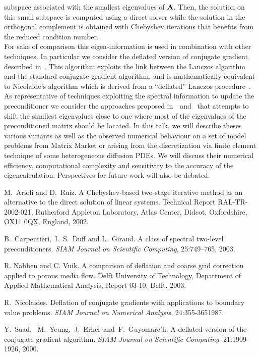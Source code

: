 \documentclass{report}
\begin{document}
subspace associated with the smallest eigenvalues of ${\bf A}$.
Then, the solution on this small subspace is computed using a direct
solver while the solution in the orthogonal complement is obtained with
Chebyshev iterations that benefits from the reduced condition number.\\
For sake of comparison this eigen-information is used in combination with
other techniques.
In particular we consider the deflated version of conjugate gradient
described in~\cite{syeg:00}.
This algorithm exploits the link between the Lanczos algorithm and the
standard conjugate gradient algorithm, and is mathematically equivalent
to Nicolaide's algorithm which is derived from a ``deflated'' Lanczos
procedure~\cite{nico:87}.\\
As representative of techniques exploiting the spectral information to
update the preconditioner we consider the approaches proposed
in~\cite{cadg:03a}~and~\cite{navu:03} that attempts to shift the smallest
eigenvalues close to one where most of the eigenvalues of the
preconditioned matrix should be located.
In this talk, we will describe theses various variants as well as the
observed numerical behaviour on a set of model problems from Matrix
Market or arising from the discretization via finite element technique of
some heterogeneous diffusion PDEs.
We will discuss their numerical efficiency, computational complexity and
sensitivity to the accuracy of the eigencalculation.
Perspectives for future work will also be debated.
\begin{thebibliography}{99}
{M.~Arioli and D.~Ruiz}.
{A {C}hebyshev-based two-stage iterative method as an alternative to the
direct solution of linear systems}.
{Technical Report RAL-TR-2002-021, Rutherford Appleton Laboratory, Atlas
Center, Didcot, Oxfordshire, OX11 0QX, England, 2002}.

{B.~Carpentieri,~I.~S.~Duff and L.~Giraud}.
{A class of spectral two-level preconditioners}.
{\em SIAM {J}ournal on {S}cientific {C}omputing}, 25:{749--765}, 2003.

{R. Nabben and C. Vuik}.
{A comparison of deflation and coarse grid correction applied to porous media flow}.
{Delft University of Technology, Department of Applied Mathematical
Analysis}, {Report 03-10}, {Delft}, 2003.

{R.~Nicolaides}.
{Deflation of conjugate gradients with applications to boundary value problems}.
{\em SIAM Journal on Numerical Analysis}, 24:{355-365}1987.

{Y.~Saad,~ M.~Yeung,~J.~Erhel~and~F.~Guyomarc'h}.
{A deflated version of the conjugate gradient algorithm}.
{\em SIAM Journal on Scientific Computing}, 21:{1909-1926}, 2000.
\end{thebibliography}
\end{document}
